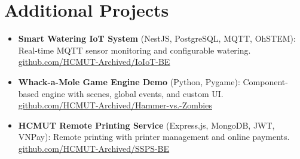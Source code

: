 \documentclass[10pt,a4paper]{article}
\newenvironment{resumeitems}{
    \begin{itemize}[
        leftmargin=1.1em,
        topsep=0.04em,
        itemsep=0pt,
        parsep=0pt,
        partopsep=0pt
    ]
}{
    \end{itemize}
}
\newcommand{\resumelink}[2]{%
    \href{#1}{\textcolor{linkColor}{\underline{#2}}}%
}
\begin{document}
\section{Additional Projects}

\begin{resumeitems}
    \item \textbf{Smart Watering IoT System} (NestJS, PostgreSQL, MQTT, OhSTEM): Real-time MQTT sensor monitoring and configurable watering. \resumelink{https://github.com/HCMUT-Archived/IoIoT-BE}{github.com/HCMUT-Archived/IoIoT-BE}
    \item \textbf{Whack-a-Mole Game Engine Demo} (Python, Pygame): Component-based engine with scenes, global events, and custom UI. \resumelink{https://github.com/HCMUT-Archived/Hammer-vs.-Zombies}{github.com/HCMUT-Archived/Hammer-vs.-Zombies}
    \item \textbf{HCMUT Remote Printing Service} (Express.js, MongoDB, JWT, VNPay): Remote printing with printer management and online payments. \resumelink{https://github.com/HCMUT-Archived/SSPS-BE}{github.com/HCMUT-Archived/SSPS-BE}
\end{resumeitems}
\end{document}
